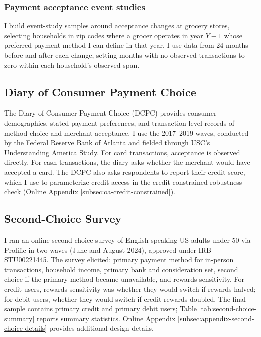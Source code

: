 \documentclass[main.tex]{subfiles}
\begin{document}
\subsubsection{Payment acceptance event studies}

I build event-study samples around acceptance changes at grocery stores, selecting households in zip codes where a grocer operates in year $Y-1$ whose preferred payment method I can define in that year.
I use data from 24 months before and after each change, setting months with no observed transactions to zero within each household's observed span.

\subsection{Diary of Consumer Payment Choice}

The Diary of Consumer Payment Choice (DCPC) provides consumer demographics, stated payment preferences, and transaction-level records of method choice and merchant acceptance. I use the 2017--2019 waves, conducted by the Federal Reserve Bank of Atlanta and fielded through USC's Understanding America Study.
For card transactions, acceptance is observed directly. For cash transactions, the diary asks whether the merchant would have accepted a card.
The DCPC also asks respondents to report their credit score, which I use to parameterize credit access in the credit-constrained robustness check (Online Appendix \ref{subsec:oa-credit-constrained}).

\subsection{Second-Choice Survey}

I ran an online second-choice survey of English-speaking US adults under 50 via Prolific in two waves (June and August 2024), approved under IRB STU00221445.
The survey elicited: primary payment method for in-person transactions, household income, primary bank and consideration set, second choice if the primary method became unavailable, and rewards sensitivity. For credit users, rewards sensitivity was whether they would switch if rewards halved; for debit users, whether they would switch if credit rewards doubled.
The final sample contains  primary credit and  primary debit users; Table \ref{tab:second-choice-summary} reports summary statistics. Online Appendix \ref{subsec:appendix-second-choice-details} provides additional design details.
\end{document}
